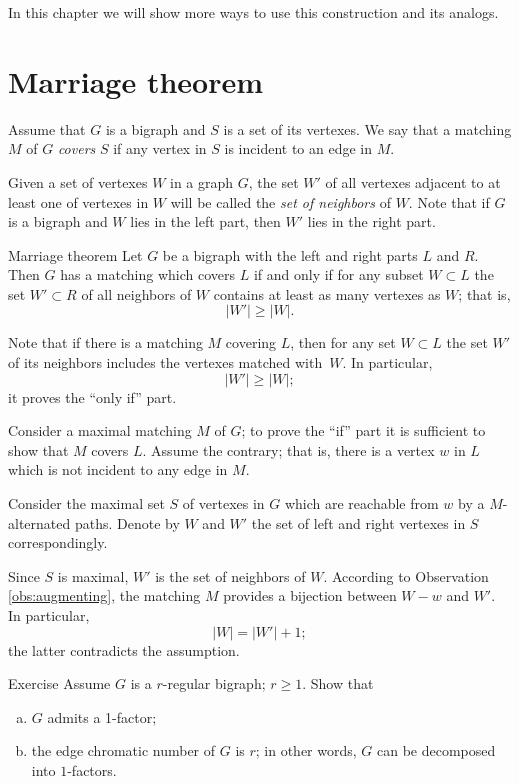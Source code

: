 In this chapter we will show more ways to use this construction and its analogs.

\section*{Marriage theorem}

Assume that $G$ is a bigraph and $S$ is a set of its vertexes.
We say that a matching $M$ of $G$ {}\emph{covers} $S$ if any vertex in $S$ is incident to an edge in $M$.

Given a set of vertexes $W$ in a graph $G$, the set $W'$ of all vertexes  adjacent to at least one of vertexes in $W$ will be called the \emph{set of neighbors} of $W$.
Note that if $G$ is a bigraph and $W$ lies in the left part, then $W'$ lies in the right part. 

\begin{thm}{Marriage theorem}
Let $G$ be a bigraph with the left and right parts $L$ and $R$.
Then $G$ has a matching which covers $L$ if and only if for any subset $W\subset L$ the set $W'\subset R$ of all neighbors of $W$ contains at least as many vertexes as $W$; that is, 
\[|W'|\ge |W|.\] 

\end{thm}

Note that if there is a matching $M$ covering $L$, then for any set  $W\subset L$ the set $W'$ of its neighbors includes the vertexes matched with~$W$.
In particular,
\[|W'|\ge |W|;\]
it proves the ``only if'' part.

Consider a maximal matching $M$ of $G$;
to prove the ``if'' part it is sufficient to show that $M$ covers $L$.
Assume the contrary; that is, there is a vertex $w$ in $L$ which is not incident to any edge in $M$.

Consider the maximal set $S$ of vertexes in $G$ which are reachable from $w$ by a 
$M$-alternated paths.
Denote by $W$ and $W'$ the set of left and right vertexes in $S$ correspondingly.

Since $S$ is maximal, $W'$ is the set of neighbors of $W$. 
According to Observation \ref{obs:augmenting}, the matching $M$ provides a bijection between $W-w$ and $W'$.
In particular, 
\[|W|=|W'|+1;\] 
the latter contradicts the assumption.
\qeds

\begin{thm}{Exercise}
Assume $G$ is a $r$-regular bigraph; $r\ge 1$.
Show that 
\begin{enumerate}[(a)]
\item $G$ admits a 1-factor;
\item the edge chromatic number of $G$ is $r$; in other words, $G$ can be decomposed into $1$-factors.
\end{enumerate}

\end{thm}

